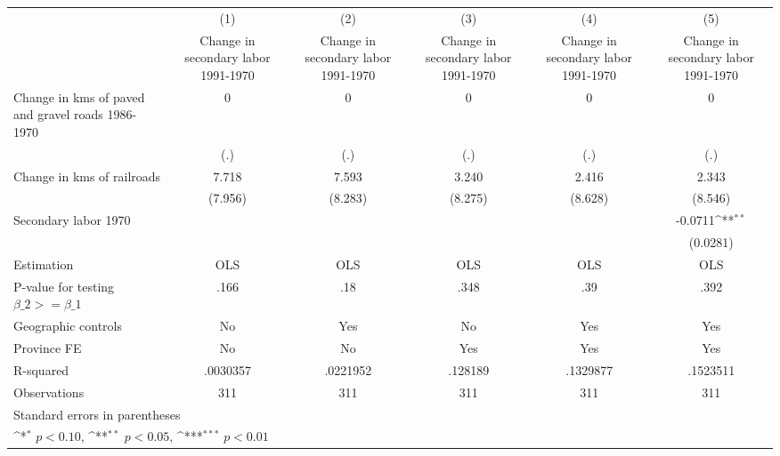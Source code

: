 {
\def\sym#1{\ifmmode^{#1}\else\(^{#1}\)\fi}
\begin{tabular}{l*{5}{c}}
\hline\hline
                    &\multicolumn{1}{c}{(1)}&\multicolumn{1}{c}{(2)}&\multicolumn{1}{c}{(3)}&\multicolumn{1}{c}{(4)}&\multicolumn{1}{c}{(5)}\\
                    &\multicolumn{1}{c}{Change in secondary labor 1991-1970}&\multicolumn{1}{c}{Change in secondary labor 1991-1970}&\multicolumn{1}{c}{Change in secondary labor 1991-1970}&\multicolumn{1}{c}{Change in secondary labor 1991-1970}&\multicolumn{1}{c}{Change in secondary labor 1991-1970}\\
\hline
Change in kms of paved and gravel roads 1986-1970&           0         &           0         &           0         &           0         &           0         \\
                    &         (.)         &         (.)         &         (.)         &         (.)         &         (.)         \\
[1em]
Change in kms of railroads&       7.718         &       7.593         &       3.240         &       2.416         &       2.343         \\
                    &     (7.956)         &     (8.283)         &     (8.275)         &     (8.628)         &     (8.546)         \\
[1em]
Secondary labor 1970&                     &                     &                     &                     &     -0.0711\sym{**} \\
                    &                     &                     &                     &                     &    (0.0281)         \\
\hline
Estimation          &         OLS         &         OLS         &         OLS         &         OLS         &         OLS         \\
P-value for testing $\beta\_2 >= \beta\_1$&        .166         &         .18         &        .348         &         .39         &        .392         \\
Geographic controls &          No         &         Yes         &          No         &         Yes         &         Yes         \\
Province FE         &          No         &          No         &         Yes         &         Yes         &         Yes         \\
R-squared           &    .0030357         &    .0221952         &     .128189         &    .1329877         &    .1523511         \\
Observations        &         311         &         311         &         311         &         311         &         311         \\
\hline\hline
\multicolumn{6}{l}{\footnotesize Standard errors in parentheses}\\
\multicolumn{6}{l}{\footnotesize \sym{*} \(p<0.10\), \sym{**} \(p<0.05\), \sym{***} \(p<0.01\)}\\
\end{tabular}
}
